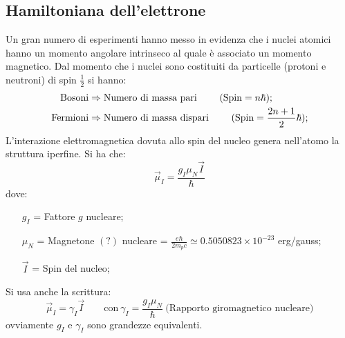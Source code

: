 \subsection{Hamiltoniana dell'elettrone}
Un gran numero di esperimenti hanno messo in evidenza che i nuclei atomici hanno
un momento angolare intrinseco al quale è associato un momento magnetico. Dal
momento che i nuclei sono costituiti da particelle (protoni e neutroni) di spin
$\frac{1}{2}$ si hanno:
\begin{equation} \begin{split}
\text{Bosoni}& \Rightarrow \text{Numero di massa pari \qquad(Spin} = n\hbar);\\
\text{Fermioni}& \Rightarrow \text{Numero di massa dispari \qquad(Spin} = 
\frac{2n+1}{2}\hbar);
\end{split}\end{equation}
L'interazione elettromagnetica dovuta allo spin del nucleo genera nell'atomo la 
struttura iperfine. Si ha che:
\begin{equation}
\vec{\mu}_I = \frac{g_I \mu_N \vec{I}} {\hbar}
\end{equation}
dove:
\begin{itemize}
\item[$g_I$]= Fattore $g$ nucleare;
\item[$\mu _N$]= Magnetone $(?)$ nucleare = $\frac{e\hbar}{2m_pc} \simeq 
0.5050823 \times 10^{-23}$ erg/gauss;
\item[$\vec{I}$]= Spin del nucleo;
\end{itemize}
Si usa anche la scrittura:
\begin{equation}
\vec{\mu}_I =  \gamma_I \vec{I} \qquad \text{con}\ \gamma_I = \frac{g_I 
\mu_N}{\hbar}\ \text{(Rapporto giromagnetico nucleare)}
\end{equation}
ovviamente $g_I$ e $\gamma_I$ sono grandezze equivalenti.

